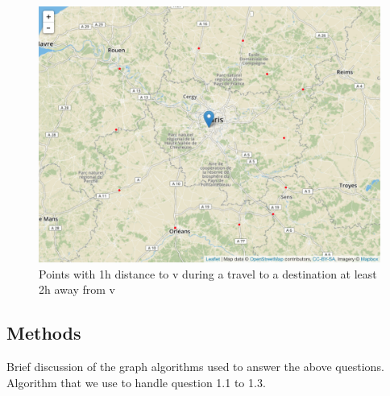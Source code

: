\documentclass[titlepage,11pt,a4paper]{article}
\begin{document}
\begin{figure}[h]
    \centering
    \includegraphics[width=\textwidth]{map_Q1.3.png}
    \caption{Points with 1h distance to v during a travel to a destination at least 2h away from v}
    \label{fig:questioin_1.3_out}
\end{figure}

\subsection{Methods}{Brief discussion of the graph algorithms used to answer the above questions.\\}
Algorithm that we use to handle question 1.1 to 1.3.
\end{document}
